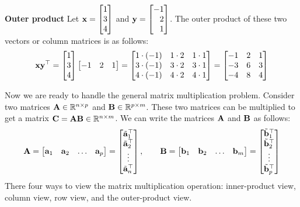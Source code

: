 \begin{boxedstuff}
    \begin{example}
        \textbf{Outer product} Let $\mf{x} = \bmxc 1 \\ 3 \\ 4 \emx$ and $\mf{y} = \bmx -1 \\ 2 \\ 1 \emx$. The outer product of these two vectors or column matrices is as follows:
        \[ \mf{x}\mf{y}^\top = \bmxc 1 \\ 3 \\ 4 \emx \bmxc -1 & 2 & 1 \emx = \bmxc 1 \cdot \pp{-1} & 1 \cdot 2 & 1 \cdot 1 \\ 3 \cdot \pp{-1} & 3 \cdot 2 & 3 \cdot 1 \\ 4 \cdot \pp{-1} & 4 \cdot 2 & 4 \cdot 1 \emx = \bmxc -1 & 2 & 1 \\ -3 & 6 & 3 \\ -4 & 8 & 4 \emx \]
        \label{example:ch02-mat-outer-prod}
    \end{example}
\end{boxedstuff}

Now we are ready to handle the general matrix multiplication problem. Consider two matrices $\mathbf{A} \in \mathbb{R}^{n \times p}$ and $\mathbf{B} \in \mathbb{R}^{p \times m}$. These two matrices can be multiplied to get a matrix $\mathbf{C} = \mathbf{A}\mathbf{B} \in \mathbb{R}^{n \times m}$. We can write the matrices $\mathbf{A}$ and $\mathbf{B}$ as follows:
\begin{equation}
    \mf{A} = \bmxc \mf{a}_1 & \mf{a}_2 & \ldots & \mf{a}_p \emx = \bmxc \tilde{\mf{a}}_1^\top \\ \tilde{\mf{a}}_2^\top \\ \vdots \\ \tilde{\mf{a}}_n^\top \emx , \quad \quad\mf{B} = \bmxc \mf{b}_1 & \mf{b}_2 & \ldots & \mf{b}_m \emx = \bmxc \tilde{\mf{b}}_1^\top \\ \tilde{\mf{b}}_2^\top \\ \vdots \\ \tilde{\mf{b}}_p^\top \emx
    \label{eq:ch02-mat-AB-view}
\end{equation}
There four ways to view the matrix multiplication operation: inner-product view, column view, row view, and the outer-product view.

